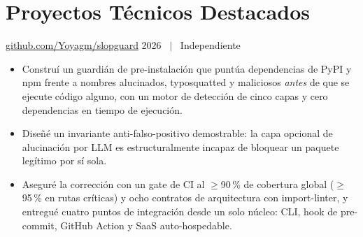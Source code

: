 \section{Proyectos Técnicos Destacados}

%
  {\href{https://github.com/Yoyagm/slopguard}{github.com/Yoyagm/slopguard}}%
  {2026 \ $\vert$ \ Independiente}
\begin{itemize}
  \item Construí un guardián de pre-instalación que puntúa dependencias de PyPI y npm frente a
        nombres alucinados, typosquatted y maliciosos \emph{antes} de que se ejecute código alguno,
        con un motor de detección de cinco capas y cero dependencias en tiempo de ejecución.
  \ifonepage\else
  \item Diseñé un invariante anti-falso-positivo demostrable: la capa opcional de alucinación por
        LLM es estructuralmente incapaz de bloquear un paquete legítimo por sí sola.
  \fi
  \item Aseguré la corrección con un gate de CI al $\geq$90\,\% de cobertura global ($\geq$95\,\%
        en rutas críticas) y ocho contratos de arquitectura con import-linter, y entregué cuatro
        puntos de integración desde un solo núcleo: CLI, hook de pre-commit, GitHub Action y SaaS
        auto-hospedable.
\end{itemize}

